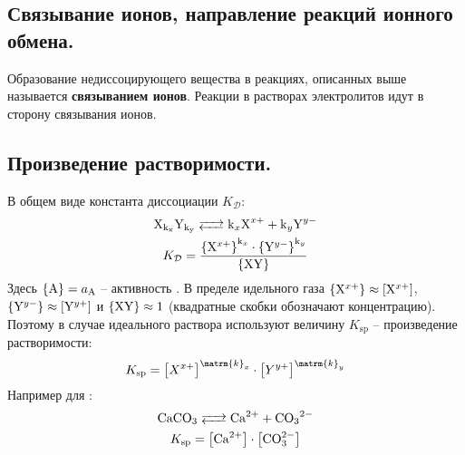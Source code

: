 \subsection{Связывание ионов, направление реакций ионного обмена.}
Образование недиссоцирующего вещества в реакциях, описанных выше называется \textbf{связыванием ионов}. Реакции в растворах электролитов идут в сторону связывания ионов. 
\subsection{Произведение растворимости.}
В общем виде константа диссоциации $K_{\mathcal{D}}$:
\begin{gather*}
    \ce{X_{k_{x}}Y_{k_{y}} <--> k_{x}X^{x+} + k_{y}Y^{y-}}\\
    K_{\mathcal{D}} = \frac{\left\lbrace\ce{X}^{x+}\right\rbrace^{\mathrm{k}_{x}}\cdot \left\lbrace\ce{Y}^{y-}\right\rbrace^{\mathrm{k}_{y}}}{\left\lbrace\ce{XY}\right\rbrace}
\end{gather*}
Здесь $\lbrace \ce{A} \rbrace = a_{\ce{A}}$ -- активность . В пределе идельного газа $\left\lbrace\ce{X}^{x+}\right\rbrace\approx \left[\ce{X}^{x+}\right]$, $\left\lbrace\ce{Y}^{y-}\right\rbrace\approx \left[\ce{Y}^{y+}\right]$ и  $\left\lbrace\ce{XY}\right\rbrace \approx 1$ (квадратные скобки обозначают концентрацию). Поэтому в случае идеального раствора используют величину $K_{\mathrm{sp}}$ -- произведение растворимости:
\begin{equation}
K_{\mathrm{sp}} = \left[X^{x+}\right]^{\matrm{k}_{x}}\cdot \left[Y^{y+}\right]^{\matrm{k}_{y}}
\end{equation}
Например для :
\begin{gather*}
    \ce{CaCO3 <--> Ca^{2+} + CO3^{2-}}\\
    K_{\mathrm{sp}} = \left[\ce{Ca}^{2+}\right]\cdot\left[\ce{CO3}^{2-}\right]
\end{gather*}
